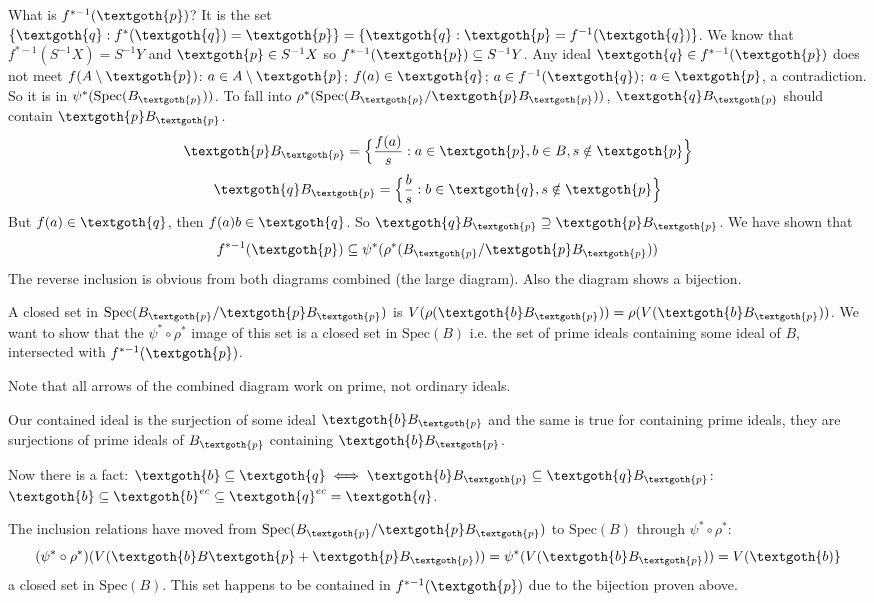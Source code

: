 \documentclass{article}
\begin{document}
\vspace{2mm}

What is $f^{*-1}(\textgoth{p})$? It is the set $\{ \textgoth{q}: f^*(\textgoth{q}) = \textgoth{p}\} = \{ \textgoth{q}: \textgoth{p} = f^{-1}(\textgoth{q})\}$. We know that $f^{*-1}(S^{-1}X) = S^{-1}Y$ and $\textgoth{p} \in S^{-1}X$ so $f^{*-1}(\textgoth{p}) \subseteq S^{-1}Y$. Any ideal $\textgoth{q} \in f^{*-1}(\textgoth{p})$ does not meet $f(A \setminus \textgoth{p})$: $a \in A \setminus \textgoth{p}$; $f(a) \in \textgoth{q}$; $a \in f^{-1}(\textgoth{q})$; $a \in \textgoth{p}$, a contradiction. So it is in $\psi^*(\textrm{Spec}(B_\textgoth{p}))$. To fall into $\rho^*(\textrm{Spec}(B_\textgoth{p}/\textgoth{p}B_\textgoth{p}))$, $\textgoth{q}B_\textgoth{p}$ should contain $\textgoth{p}B_\textgoth{p}$.
\[
\textgoth{p}B_\textgoth{p} = \Big\{\frac{f(a)}{s}: a \in \textgoth{p}, b \in B, s \notin \textgoth{p} \Big\}
\]
\[
\textgoth{q}B_\textgoth{p} = \Big\{\frac{b}{s}: b \in \textgoth{q}, s \notin \textgoth{p} \Big\}
\]
But $f(a) \in \textgoth{q}$, then $f(a)b \in \textgoth{q}$. So $\textgoth{q}B_\textgoth{p} \supseteq \textgoth{p}B_\textgoth{p}$. We have shown that
\[
f^{*-1}(\textgoth{p}) \subseteq \psi^*(\rho^*(B_\textgoth{p}/\textgoth{p}B_\textgoth{p}))
\]
The reverse inclusion is obvious from both diagrams combined (the large diagram). Also the diagram shows  a bijection.

A closed set in $\textrm{Spec}(B_\textgoth{p}/\textgoth{p}B_\textgoth{p})$ is $V(\rho(\textgoth{b}B_\textgoth{p})) = \rho(V(\textgoth{b}B_\textgoth{p}))$. We want to show that the $\psi^* \circ \rho^*$ image of this set is a closed set in $\textrm{Spec}(B)$ i.e. the set of prime ideals containing some ideal of $B$, intersected with $f^{*-1}(\textgoth{p})$.

Note that all arrows of the combined diagram work on prime, not ordinary ideals.

Our contained ideal is the surjection of some ideal $\textgoth{b}B_\textgoth{p}$ and the same is true for containing prime ideals, they are surjections of prime ideals of $B_\textgoth{p}$ containing $\textgoth{b}B_\textgoth{p}$.

Now there is a fact: $\textgoth{b} \subseteq \textgoth{q} \iff \textgoth{b}B_\textgoth{p} \subseteq \textgoth{q}B_\textgoth{p}$: $\textgoth{b} \subseteq \textgoth{b}^{ec} \subseteq \textgoth{q}^{ec} = \textgoth{q}$. 

The inclusion relations have moved from $\textrm{Spec}(B_\textgoth{p}/\textgoth{p}B_\textgoth{p})$ to $\textrm{Spec}(B)$ through $\psi^* \circ \rho^*$: 
\[
(\psi^* \circ \rho^*) (V(\textgoth{b}B\textgoth{p} + \textgoth{p}B_\textgoth{p})) 
= \psi^*(V(\textgoth{b}B_\textgoth{p}))
= V(\textgoth{b)}
\]
a closed set in $\textrm{Spec}(B)$. This set happens to be contained in $f^{*-1}(\textgoth{p})$ due to the bijection proven above.
\end{document}
